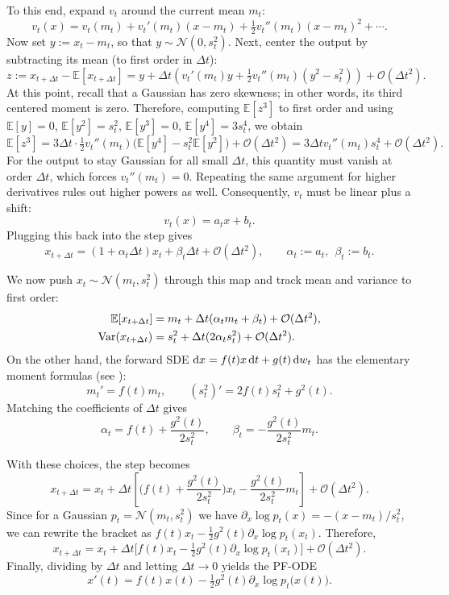 To this end, expand $v_t$ around the current mean $m_t$:
\[
v_t(x)=v_t(m_t)+v_t'(m_t)(x-m_t)+\tfrac12 v_t''(m_t)(x-m_t)^2+\cdots.
\]
Now set $y:=x_t-m_t$, so that $y\sim\mathcal N(0,s_t^2)$. Next, center the output by subtracting its mean (to first order in $\Delta t$):
\[
z:=x_{t+\Delta t}-\mathbb E[x_{t+\Delta t}]
= y + \Delta t\!\left(v_t'(m_t) y+\tfrac12 v_t''(m_t) (y^2-s_t^2)\right)+\mathcal{O}(\Delta t^2).
\]
At this point, recall that a Gaussian has zero skewness; in other words, its third centered moment is zero. Therefore, computing $\mathbb E[z^3]$ to first order and using
$\mathbb E[y]=0$, $\mathbb E[y^2]=s_t^2$, $\mathbb E[y^3]=0$, $\mathbb E[y^4]=3s_t^4$,
we obtain
\[
\mathbb E[z^3]
= 3 \Delta t\cdot \tfrac12 v_t''(m_t) \big(\mathbb E[y^4]-s_t^2\mathbb E[y^2]\big)+\mathcal{O}(\Delta t^2)
= 3 \Delta t v_t''(m_t) s_t^4+\mathcal{O}(\Delta t^2).
\]
For the output to stay Gaussian for all small $\Delta t$, this quantity must vanish at order $\Delta t$, which forces $v_t''(m_t)=0$. Repeating the same argument for higher derivatives rules out higher powers as well. Consequently, $v_t$ must be linear plus a shift:
\[
v_t(x)=a_t x+b_t.
\]
Plugging this back into the step gives
\[
x_{t+\Delta t}=(1+\alpha_t \Delta t) x_t+\beta_t \Delta t+\mathcal{O}(\Delta t^2),
\qquad
\alpha_t:=a_t,\ \ \beta_t:=b_t.
\]

We now push $x_t\sim\mathcal N(m_t,s_t^2)$ through this map and track mean and variance to first order:
\begin{align*}
\mathbb E[x_{t+\Delta t}]
&= m_t+\Delta t(\alpha_t m_t+\beta_t)+\mathcal{O}(\Delta t^2),
\\
\mathrm{Var}(x_{t+\Delta t})
&= s_t^2+\Delta t (2\alpha_t s_t^2)+\mathcal{O}(\Delta t^2).
\end{align*}
On the other hand, the forward SDE $\mathop{}\!\mathrm{d} x=f(t) x \mathop{}\!\mathrm{d} t+g(t) \mathop{}\!\mathrm{d} w_t$ has the elementary moment formulas (see ):
\[
m_t' = f(t) m_t,
\qquad
(s_t^2)' = 2 f(t) s_t^2 + g^2(t).
\]
Matching the coefficients of $\Delta t$ gives
\[
\alpha_t = f(t)+\frac{g^2(t)}{2 s_t^2},
\qquad
\beta_t = - \frac{g^2(t)}{2 s_t^2} m_t.
\]

With these choices, the step becomes
\[
x_{t+\Delta t}
= x_t + \Delta t\!\left[\Big(f(t)+\frac{g^2(t)}{2s_t^2}\Big)x_t
-\frac{g^2(t)}{2s_t^2} m_t\right]+\mathcal{O}(\Delta t^2).
\]
Since for a Gaussian $p_t=\mathcal N(m_t,s_t^2)$ we have $\partial_x\log p_t(x)=-(x-m_t)/s_t^2$, we can rewrite the bracket as
$f(t) x_t - \tfrac12 g^2(t) \partial_x\log p_t(x_t)$.
Therefore,
\[
x_{t+\Delta t}
= x_t + \Delta t\Big[f(t) x_t - \tfrac12 g^2(t) \partial_x\log p_t(x_t)\Big] + \mathcal{O}(\Delta t^2).
\]
Finally, dividing by $\Delta t$ and letting $\Delta t\to 0$ yields the PF-ODE
\[
x'(t)  =  f(t) x(t)  -  \tfrac12 g^2(t) \partial_x\log p_t\!\big(x(t)\big).
\]

